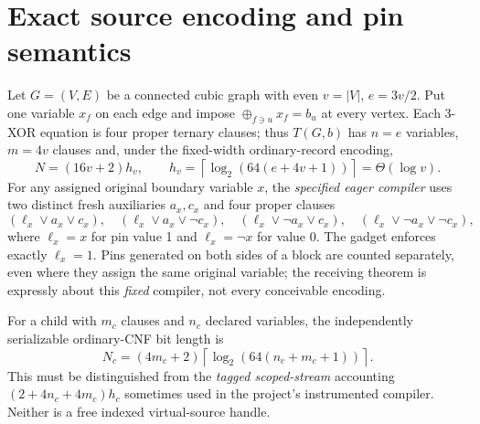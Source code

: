 \documentclass[11pt]{article}
\begin{document}
\section{Exact source encoding and pin semantics}
Let $G=(V,E)$ be a connected cubic graph with even $v=|V|$, $e=3v/2$. Put one variable $x_f$ on each edge and impose $\oplus_{f\ni u}x_f=b_u$ at every vertex. Each 3-XOR equation is four proper ternary clauses; thus $T(G,b)$ has $n=e$ variables, $m=4v$ clauses and, under the fixed-width ordinary-record encoding,
\[
N=(16v+2)h_v,\qquad
h_v=\left\lceil\log_2(64(e+4v+1))\right\rceil
=\Theta(\log v).
\]
For any assigned original boundary variable $x$, the \emph{specified eager compiler} uses two distinct fresh auxiliaries $a_x,c_x$ and four proper clauses
\[
(\ell_x\vee a_x\vee c_x),\quad
(\ell_x\vee a_x\vee\neg c_x),\quad
(\ell_x\vee\neg a_x\vee c_x),\quad
(\ell_x\vee\neg a_x\vee\neg c_x),
\]
where $\ell_x=x$ for pin value 1 and $\ell_x=\neg x$ for value 0. The gadget enforces exactly $\ell_x=1$. Pins generated on both sides of a block are counted separately, even where they assign the same original variable; the receiving theorem is expressly about this \emph{fixed} compiler, not every conceivable encoding.

For a child with $m_c$ clauses and $n_c$ declared variables, the independently serializable ordinary-CNF bit length is
\[
N_c=(4m_c+2)\left\lceil\log_2(64(n_c+m_c+1))\right\rceil.
\]
This must be distinguished from the \emph{tagged scoped-stream} accounting $(2+4n_c+4m_c)h_c$ sometimes used in the project's instrumented compiler. Neither is a free indexed virtual-source handle.
\end{document}
